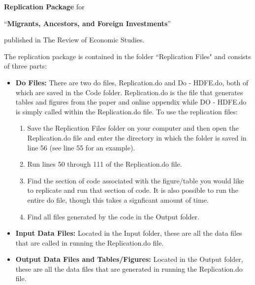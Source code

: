 \documentclass[12pt, letter]{article}
\begin{document}
 

\begin{center}
{\Large {\textbf{Replication Package} for } \bigskip }

{\Large {``\textbf{Migrants, Ancestors, and Foreign Investments}''} \bigskip }

{\Large {published in The Review of Economic Studies.}\bigskip }

\end{center}

The replication package is contained in the folder ``Replication Files" and consists of three parts:
\begin{itemize}
\item \textbf{Do Files:} There are two do files, Replication.do and Do - HDFE.do, both of which are saved in the Code folder. Replication.do is the file that generates tables and figures from the paper and online appendix while DO - HDFE.do is simply called within the Replication.do file. To use the replication files:
\begin{enumerate}
\item Save the Replication Files folder on your computer and then open the Replication.do file and enter the directory in which the folder is saved in line 56 (see line 55 for an example). 
\item Run lines 50 through 111 of the Replication.do file.
\item Find the section of code associated with the figure/table you would like to replicate and run that section of code. It is also possible to run the entire do file, though this takes a signficant amount of time.
\item Find all files generated by the code in the Output folder.
\end{enumerate}
\item \textbf{Input Data Files: } Located in the Input folder, these are all the data files that are called in running the Replication.do file.
\item \textbf{Output Data Files and Tables/Figures: } Located in the Output folder, these are all the data files that are generated in running the Replication.do file.
\end{itemize}
\end{document}
